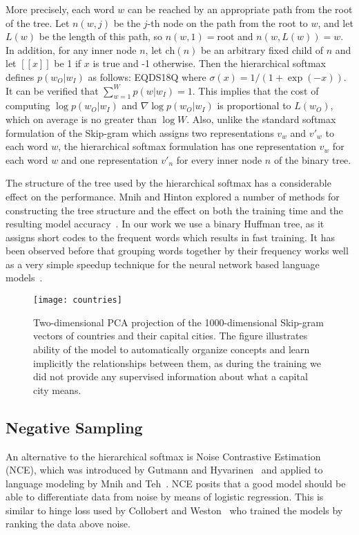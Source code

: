\documentclass{article}
\begin{document}
More precisely, each word $w$ can be reached by an appropriate path
from the root of the tree. Let $n(w,j)$ be the $j$-th node on the
path from the root to $w$, and let $L(w)$ be the length of this path,
so $n(w,1)=\mathrm{root}$ and $n(w,L(w))=w$.  In addition, for any
inner node $n$, let $\mathrm{ch}(n)$ be an arbitrary fixed child of
$n$ and let $[\![x]\!]$ be 1 if $x$ is true and -1 otherwise.
Then the hierarchical softmax defines $p(w_O|w_I)$ as follows:
EQDS18Q
where $\sigma(x)=1/(1+\exp(-x))$. It can be verified that
$\sum_{w=1}^W p(w|w_I)=1$. This implies that
the cost of computing $\log p(w_O|w_I)$ and $\nabla
\log p(w_O|w_I)$ is proportional to $L(w_O)$, which on average is no greater
than $\log W$. Also, unlike the standard softmax formulation of the Skip-gram
which assigns two representations $v_w$ and $v'_w$ to each word $w$, the
hierarchical softmax formulation has
one representation $v_w$ for each word $w$ and one representation $v'_n$
for every inner node $n$ of the binary tree.

The structure of the tree used by the hierarchical softmax has
a considerable effect on the performance. Mnih and Hinton
explored a number of methods for constructing the tree structure
and the effect on both the training time and the resulting model accuracy~\cite{mnih}.
In our work we use a binary Huffman tree, as it assigns short codes to the frequent words
which results in fast training. It has been observed before that grouping words together
by their frequency works well as a very simple speedup technique for the neural
network based language models~\cite{mikolov3,mikolov}.

\begin{figure}[t]
\centering
\centerline{\texttt{[image: countries]}}
\caption{\small Two-dimensional PCA projection of the
  1000-dimensional Skip-gram vectors of countries and their capital
  cities. The figure illustrates ability of the model to automatically organize
  concepts and learn implicitly the relationships between them, as during the
  training we did not provide any supervised information about what a capital
  city means.}
\end{figure}

\subsection{Negative Sampling}

An alternative to the hierarchical softmax is Noise Contrastive
Estimation (NCE), which was introduced by Gutmann and Hyvarinen~\cite{nce}
and applied to language modeling by Mnih and Teh~\cite{mnih-nce}.
NCE posits that a good model should be able to
differentiate data from noise by means of logistic regression. This is
similar to hinge loss used by Collobert and Weston~\cite{collobert} who trained
the models by ranking the data above noise.
\end{document}
